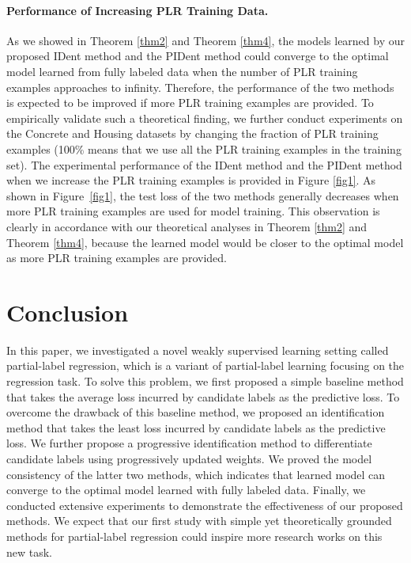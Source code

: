 \documentclass[letterpaper]{article} %
\begin{document}
\paragraph{Performance of Increasing PLR Training Data.} As we showed in Theorem \ref{thm2} and Theorem \ref{thm4}, the models learned by our proposed IDent method and the PIDent method could converge to the optimal model learned from fully labeled data when the number of PLR training examples approaches to infinity. Therefore, the performance of the two methods is expected to be improved if more PLR training examples are provided. To empirically validate such a theoretical finding, we further conduct experiments on the Concrete and Housing datasets by changing the fraction of PLR training examples (100\% means that we use all the PLR training examples in the training set). The experimental performance of the IDent method and the PIDent method when we increase the PLR training examples is provided in Figure \ref{fig1}. As shown in Figure~\ref{fig1}, the test loss of the two methods generally decreases when more PLR training examples are used for model training. This observation is clearly in accordance with our theoretical analyses in Theorem \ref{thm2} and Theorem \ref{thm4}, because the learned model would be closer to the optimal model as more PLR training examples are provided.
\section{Conclusion}
In this paper, we investigated a novel weakly supervised learning setting called partial-label regression, which is a variant of partial-label learning focusing on the regression task. 
To solve this problem, we first proposed a simple baseline method that takes the average loss incurred by candidate labels as the predictive loss. To overcome the drawback of this baseline method, we proposed an identification method that takes the least loss incurred by candidate labels as the predictive loss. We further propose a progressive identification method to differentiate candidate labels using progressively updated weights. We proved the model consistency of the latter two methods, which indicates that learned model can converge to the optimal model learned with fully labeled data. Finally, we conducted extensive experiments to demonstrate the effectiveness of our proposed methods. We expect that our first study with simple yet theoretically grounded methods for partial-label regression could inspire more research works on this new task.
\end{document}
